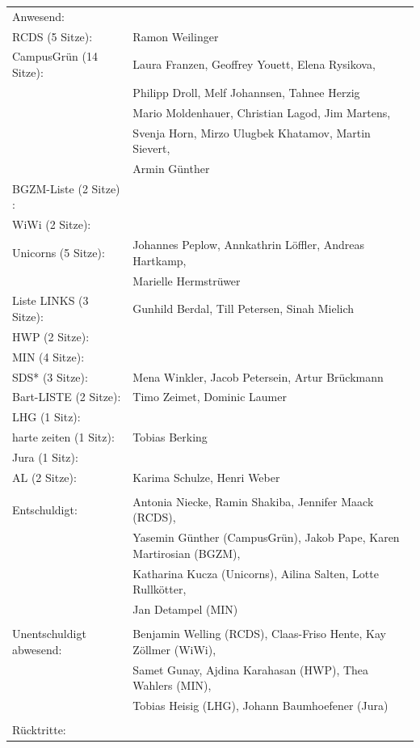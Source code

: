 \documentclass[ngerman,headheight=70pt]{scrartcl}
\begin{document}
    \begin{tabular}{ll}
        Anwesend: & \\
            RCDS (5 Sitze): & Ramon Weilinger \\
             CampusGrün (14 Sitze): & Laura Franzen, Geoffrey Youett, Elena Rysikova, \\
                                    & Philipp Droll,  Melf Johannsen, Tahnee Herzig \\
                                    & Mario Moldenhauer, Christian Lagod, Jim Martens, \\
                                    & Svenja Horn, Mirzo Ulugbek Khatamov, Martin Sievert, \\
                                    & Armin Günther \\
             BGZM-Liste (2 Sitze) : &  \\
             WiWi (2 Sitze): & \\
             Unicorns (5 Sitze): & Johannes Peplow, Annkathrin Löffler, Andreas Hartkamp, \\
                                 & Marielle Hermstrüwer \\
             Liste LINKS (3 Sitze): & Gunhild Berdal, Till Petersen, Sinah Mielich \\
             HWP (2 Sitze): &  \\
             MIN (4 Sitze): &   \\
             SDS* (3 Sitze): & Mena Winkler, Jacob Petersein, Artur Brückmann \\
             Bart-LISTE (2 Sitze): & Timo Zeimet, Dominic Laumer \\
             LHG (1 Sitz): &  \\
             harte zeiten (1 Sitz): & Tobias Berking \\
             Jura (1 Sitz): & \\
             AL (2 Sitze): & Karima Schulze, Henri Weber \\
            & \\
        Entschuldigt: & Antonia Niecke, Ramin Shakiba, Jennifer Maack (RCDS), \\
                      & Yasemin Günther (CampusGrün), Jakob Pape, Karen Martirosian (BGZM), \\
                      & Katharina Kucza (Unicorns), Ailina Salten, Lotte Rullkötter, \\
                      & Jan Detampel (MIN) \\
                      &\\
        Unentschuldigt abwesend: & Benjamin Welling (RCDS), Claas-Friso Hente, Kay Zöllmer (WiWi), \\
                                & Samet Gunay, Ajdina Karahasan (HWP), Thea Wahlers (MIN), \\
                                & Tobias Heisig (LHG), Johann Baumhoefener (Jura)\\
                                &\\
        Rücktritte: & \\
    \end{tabular}
\end{document}

